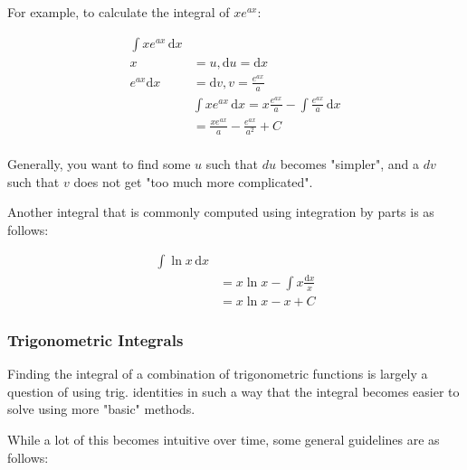 \documentclass[12pt]{article}
\begin{document}
For example, to calculate the integral of $x e^{ax}$:

\begin{equation}
    \begin{split}
        \int x e^{ax} \,\text{d}x&\\
        x &= u, \text{d}u = \text{d}x\\
    e^{ax} \text{d}x &= \text{d}v, v = \frac{e^{ax}}{a}\\
    &\int x e^{ax} \,\text{d}x = x \frac{e^{ax}}{a} - \int \frac{e^{ax}}{a}\, \text{d}x\\
    &= \frac{xe^{ax}}{a} - \frac{e^{ax}}{a^2}+C\\
    \end{split}
\end{equation}

Generally, you want to find some $u$ such that $du$ becomes "simpler", and a $dv$ such that $v$ does not get "too much more complicated".

Another integral that is commonly computed using integration by parts is as follows:

\begin{equation}
    \begin{split}
        \int \ln x \,\text{d}x&\\
        &= x \ln x - \int x \frac{\text{d}x}{x}\\
        &= x \ln x - x + C
    \end{split}
\end{equation}

\subsubsection{Trigonometric Integrals}

Finding the integral of a combination of trigonometric functions is largely a question of using trig. identities in such a way that the integral becomes easier to solve using more "basic" methods. 

While a lot of this becomes intuitive over time, some general guidelines are as follows:
\end{document}
